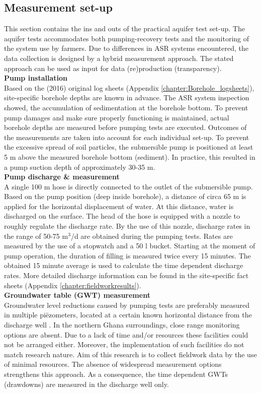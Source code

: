 \subsection{Measurement set-up}
\label{subsection:measurement_structure}
This section contains the ins and outs of the practical aquifer test set-up. The aquifer tests accommodates both pumping-recovery tests and the monitoring of the system use by farmers. Due to differences in ASR systems encountered, the data collection is designed by a hybrid measurement approach. The stated approach can be used as input for data (re)production (transparency). \\

\textbf{Pump installation} \\
Based on the (2016) original log sheets (Appendix \ref{chapter:Borehole_logsheets}), site-specific borehole depths are known in advance. The ASR system inspection showed, the accumulation of sedimentation at the borehole bottom. To prevent pump damages and make sure properly functioning is maintained, actual borehole depths are measured before pumping tests are executed. Outcomes of the measurements are taken into account for each individual set-up. To prevent the excessive spread of soil particles, the submersible pump is positioned at least 5 m above the measured borehole bottom (sediment). In practice, this resulted in a pump suction depth of approximately 30-35 m.
\bigskip \\
\textbf{Pump discharge \& measurement} \\
A single 100 m hose is directly connected to the outlet of the submersible pump. Based on the pump position (deep inside borehole), a distance of circa 65 m is applied for the horizontal displacement of water. At this distance, water is discharged on the surface. The head of the hose is equipped with a nozzle to roughly regulate the discharge rate. By the use of this nozzle, discharge rates in the range of 50-75 m$^{3}$/d are obtained during the pumping tests. Rates are measured by the use of a stopwatch and a 50 l bucket. Starting at the moment of pump operation, the duration of filling is measured twice every 15 minutes. The obtained 15 minute average is used to calculate the time dependent discharge rates. More detailed discharge information can be found in the site-specific fact sheets (Appendix \ref{chapter:fieldworkresults}).
\bigskip \\
\textbf{Groundwater table (GWT) measurement} \\
Groundwater level reductions caused by pumping tests are preferably measured in multiple piëzometers, located at a certain known horizontal distance from the discharge well \citep{Kruseman2000}. In the northern Ghana surroundings, close range monitoring options are absent. Due to a lack of time and/or resources these facilities could not be arranged either. Moreover, the implementation of such facilities do not match research nature. Aim of this research is to collect fieldwork data by the use of minimal resources. The absence of widespread measurement options strengthens this approach. As a consequence, the time dependent GWTs (drawdowns) are measured in the discharge well only. \\
